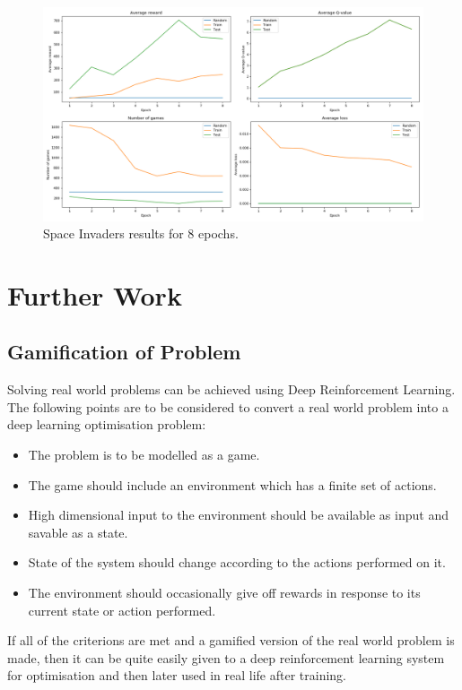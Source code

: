 \documentclass[a4paper,11pt]{article}
\begin{document}
			\begin{figure}[!h]
				\begin{centering}
					\includegraphics[width=15cm]{images/space_invaders.png}
					\caption{Space Invaders results for 8 epochs.}
				\end{centering}
			\end{figure}			

	\section{Further Work}
		\subsection{Gamification of Problem}
			Solving real world problems can be achieved using Deep Reinforcement Learning. The following points are to be considered to convert a real world problem into a deep learning optimisation problem:
			\begin{itemize}
				\setlength\itemsep{0em}
				\item The problem is to be modelled as a game.
				\item The game should include an environment which has a finite set of actions.
				\item High dimensional input to the environment should be available as input and savable as a state.
				\item State of the system should change according to the actions performed on it.
				\item The environment should occasionally give off rewards in response to its current state or action performed.
			\end{itemize}

			If all of the criterions are met and a gamified version of the real world problem is made, then it can be quite easily given to a deep reinforcement learning system for optimisation and then later used in real life after training.
\end{document}
